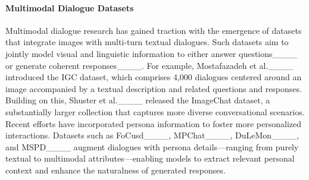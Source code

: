 
\paragraph{Multimodal Dialogue Datasets}
Multimodal dialogue research has gained traction with the emergence of datasets that integrate images with multi-turn textual dialogues. Such datasets aim to jointly model visual and linguistic information to either answer questions____ or generate coherent responses____. For example, Mostafazadeh et al.____ introduced the IGC dataset, which comprises 4,000 dialogues centered around an image accompanied by a textual description and related questions and responses. Building on this, Shuster et al.____ released the ImageChat dataset, a substantially larger collection that captures more diverse conversational scenarios.
Recent efforts have incorporated persona information to foster more personalized interactions. Datasets such as FoCusd____, MPChat____, DuLeMon____, and MSPD____ augment dialogues with persona details—ranging from purely textual to multimodal attributes—enabling models to extract relevant personal context and enhance the naturalness of generated responses.

